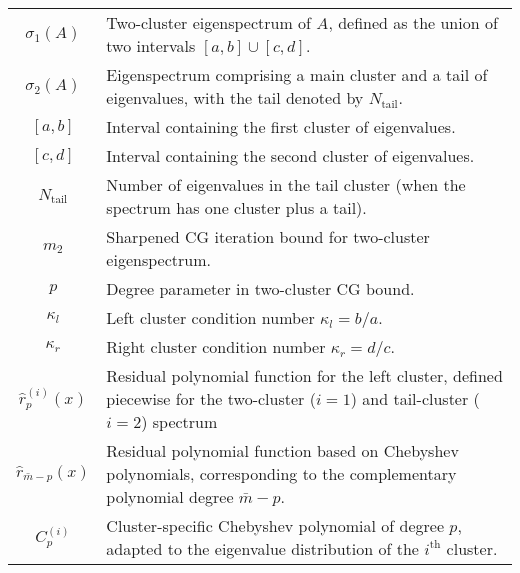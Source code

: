 \begin{longtable}{c p{10cm}}
    $\sigma_1(A)$                    & Two-cluster eigenspectrum of $A$, defined as the union of two intervals $[a,b] \cup [c,d]$.                                                               \\
    $\sigma_2(A)$                    & Eigenspectrum comprising a main cluster and a tail of eigenvalues, with the tail denoted by $N_{\text{tail}}$.                                            \\
    $[a,b]$                          & Interval containing the first cluster of eigenvalues.                                                                                                     \\
    $[c,d]$                          & Interval containing the second cluster of eigenvalues.                                                                                                    \\
    $N_{\text{tail}}$                & Number of eigenvalues in the tail cluster (when the spectrum has one cluster plus a tail).                                                                \\
    $m_2$                            & Sharpened CG iteration bound for two-cluster eigenspectrum.                                                                                               \\
    $p$                              & Degree parameter in two-cluster CG bound.                                                                                                                 \\
    $\kappa_l$                       & Left cluster condition number $\kappa_l = b/a$.                                                                                                           \\
    $\kappa_r$                       & Right cluster condition number $\kappa_r = d/c$.                                                                                                          \\
    $\hat{r}^{(i)}_p(x)$             & Residual polynomial function for the left cluster, defined piecewise for the two-cluster ($i=1$) and tail-cluster ($i=2$) spectrum                        \\
    $\hat{r}_{\bar{m}-p}(x)$         & Residual polynomial function based on Chebyshev polynomials, corresponding to the complementary polynomial degree $\bar{m}-p$.                            \\
    $C^{(i)}_{p}$                    & Cluster-specific Chebyshev polynomial of degree $p$, adapted to the eigenvalue distribution of the $i^\text{th}$ cluster.                                 \\

\end{longtable}
